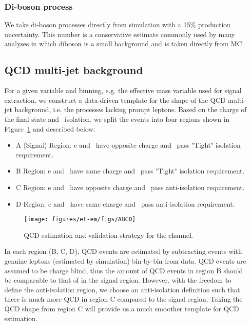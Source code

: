 \subsubsection{Di-boson process}
We take di-boson processes directly from simulation with a 15\% production uncertainty. This number is a conservative estimate commonly used by many analyses in which diboson is a small background and is taken directly from MC.

    
\subsection{QCD multi-jet background}\label{sec:etau_qcd}
For a given variable and binning, e.g. the effective mass variable
used for signal extraction, we construct a data-driven template for
the shape of the QCD multi-jet background, i.e. the processes lacking
prompt leptons.  Based on the charge of the final state and \tauh ~isolation,
we split the events into four regions shown in Figure~\ref{fig:ABCD} and 
described below:
\begin{itemize}
  \item A (Signal) Region: e and \tauh ~have opposite charge and \tauh ~pass "Tight" isolation requirement.
  \item B Region: e and \tauh ~have same charge and ~\tauh pass "Tight" isolation requirement.
  \item C Region: e and \tauh ~have opposite charge and \tauh ~pass anti-isolation requirement.
  \item D Region: e and \tauh ~have same charge and \tauh ~pass anti-isolation requirement.
\end{itemize}

\begin{figure}[thbp!]\centering
  \texttt{[image: figures/et-em/figs/ABCD]}
  \caption{\label{fig:ABCD} QCD estimation and validation strategy for the \teth channel.}
\end{figure}
In each region (B, C, D), QCD events are estimated by subtracting events
with genuine leptons (estimated by simulation) bin-by-bin from data.
QCD events are assumed to be charge blind, thus the amount of QCD events in region B should be 
comparable to that of in the signal region. However, with the freedom to define the
anti-isolation region, we choose an anti-isolation definition such
that there is much more QCD in region C compared to the signal region. 
Taking the QCD shape from region C will provide us 
a much smoother template for QCD estimation.

